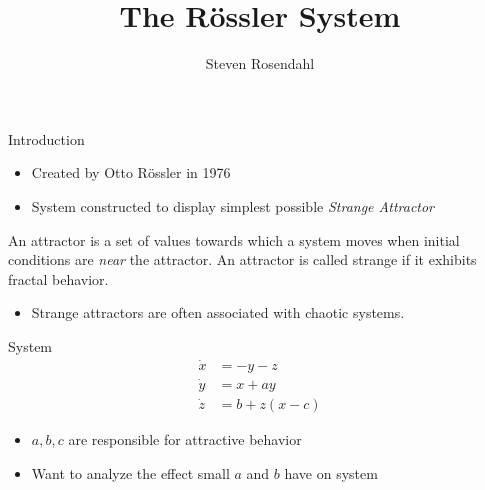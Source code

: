 \documentclass{beamer}
\title{The R\"{o}ssler System}
\author{Steven Rosendahl}
\date{}
\begin{document}
\begin{frame}
    \titlepage
\end{frame}

\begin{frame}{Introduction}
    \begin{itemize}
        \item Created by Otto R\"{o}ssler in 1976
        \pause
        \item System constructed to display simplest possible \textit{Strange Attractor}
        \pause
    \end{itemize}
    \begin{definition}
        An \alert{attractor} is a set of values towards which a system moves when initial conditions are \textit{near} the attractor.
        \pause
        An attractor is called \alert{strange} if it exhibits fractal behavior.
    \end{definition}
    \pause
    \begin{itemize}
        \item Strange attractors are often associated with chaotic systems.
    \end{itemize}
\end{frame}

\begin{frame}{System}
    \begin{align*}
        \dot{x}&= -y-z\\
        \dot{y}&= x+ay\\
        \dot{z}&= b+z(x-c)
    \end{align*}
    \pause
    \begin{itemize}
        \item $a,b,c$ are responsible for attractive behavior
        \pause
        \item Want to analyze the effect small $a$ and $b$ have on system
    \end{itemize}
\end{frame}
\end{document}
